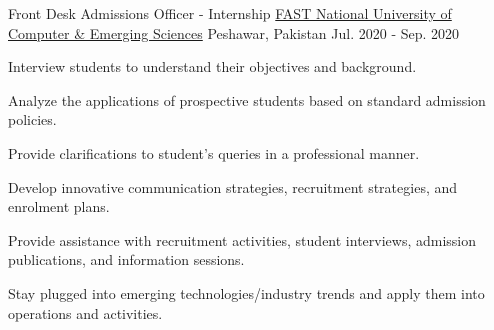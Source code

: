 \begin{cventries}
\hspace{2em}

\cventry
{Front Desk Admissions Officer - Internship} %
{\href{http://www.nu.edu.pk/}{FAST National University of Computer \& Emerging Sciences}} %
{Peshawar, Pakistan} %
{Jul. 2020 - Sep. 2020} %
{ %
\begin{cvitems}
\item{Interview students to understand their objectives and background.}
\item {Analyze the applications of prospective students based on standard admission policies.}
\item {Provide clarifications to student’s queries in a professional manner.}
\item{Develop innovative communication strategies, recruitment strategies, and enrolment plans.}
\item{Provide assistance with recruitment activities, student interviews, admission publications, and information sessions.}
\item{Stay plugged into emerging technologies/industry trends and apply them into operations and activities.}
\end{cvitems} 
}



\end{cventries}